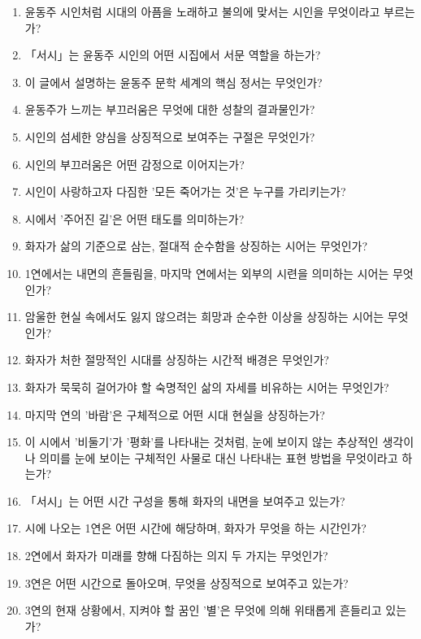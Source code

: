 \documentclass[fs9,seriesRus]{korfarm-base}
\begin{document}
\kfActivityBg {}
\par{}\par\nopagebreak[4]\smallskip\nopagebreak[4]
\begin{enumerate}[leftmargin=22pt, itemsep=6pt, topsep=4pt, label=\textbf{\arabic*.}]
\item 윤동주 시인처럼 시대의 아픔을 노래하고 불의에 맞서는 시인을 무엇이라고 부르는가?
\item 「서시」는 윤동주 시인의 어떤 시집에서 서문 역할을 하는가?
\item 이 글에서 설명하는 윤동주 문학 세계의 핵심 정서는 무엇인가?
\item 윤동주가 느끼는 부끄러움은 무엇에 대한 성찰의 결과물인가?
\item 시인의 섬세한 양심을 상징적으로 보여주는 구절은 무엇인가?
\item 시인의 부끄러움은 어떤 감정으로 이어지는가?
\item 시인이 사랑하고자 다짐한 '모든 죽어가는 것'은 누구를 가리키는가?
\item 시에서 '주어진 길'은 어떤 태도를 의미하는가?
\item 화자가 삶의 기준으로 삼는, 절대적 순수함을 상징하는 시어는 무엇인가?
\item 1연에서는 내면의 흔들림을, 마지막 연에서는 외부의 시련을 의미하는 시어는 무엇인가?
\item 암울한 현실 속에서도 잃지 않으려는 희망과 순수한 이상을 상징하는 시어는 무엇인가?
\item 화자가 처한 절망적인 시대를 상징하는 시간적 배경은 무엇인가?
\item 화자가 묵묵히 걸어가야 할 숙명적인 삶의 자세를 비유하는 시어는 무엇인가?
\item 마지막 연의 '바람'은 구체적으로 어떤 시대 현실을 상징하는가?
\item 이 시에서 '비둘기'가 '평화'를 나타내는 것처럼, 눈에 보이지 않는 추상적인 생각이나 의미를 눈에 보이는 구체적인 사물로 대신 나타내는 표현 방법을 무엇이라고 하는가?
\item 「서시」는 어떤 시간 구성을 통해 화자의 내면을 보여주고 있는가?
\item 시에 나오는 1연은 어떤 시간에 해당하며, 화자가 무엇을 하는 시간인가?
\item 2연에서 화자가 미래를 향해 다짐하는 의지 두 가지는 무엇인가?
\item 3연은 어떤 시간으로 돌아오며, 무엇을 상징적으로 보여주고 있는가?
\item 3연의 현재 상황에서, 지켜야 할 꿈인 '별'은 무엇에 의해 위태롭게 흔들리고 있는가?
\end{enumerate}
\end{document}
